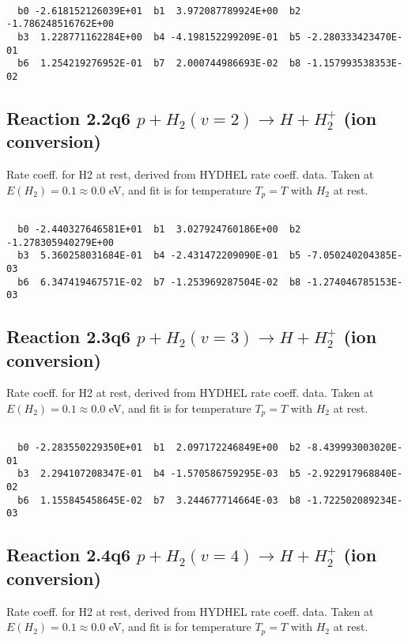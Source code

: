\documentclass[12pt,dvipdfmx]{article}
\begin{document}
\begin{small}\begin{verbatim}

  b0 -2.618152126039E+01  b1  3.972087789924E+00  b2 -1.786248516762E+00
  b3  1.228771162284E+00  b4 -4.198152299209E-01  b5 -2.280333423470E-01
  b6  1.254219276952E-01  b7  2.000744986693E-02  b8 -1.157993538353E-02

\end{verbatim}\end{small}

\newpage
\subsection{
Reaction 2.2q6
$ p + H_2(v=2) \rightarrow H + H_2^+$ (ion conversion)
}
Rate coeff. for H2 at rest, derived from HYDHEL rate coeff. data.
Taken at $E(H_2) = 0.1 \approx 0.0$ eV,  and fit is for temperature $T_p=T$ with $H_2$ at rest.

\begin{small}\begin{verbatim}

  b0 -2.440327646581E+01  b1  3.027924760186E+00  b2 -1.278305940279E+00
  b3  5.360258031684E-01  b4 -2.431472209090E-01  b5 -7.050240204385E-03
  b6  6.347419467571E-02  b7 -1.253969287504E-02  b8 -1.274046785153E-03

\end{verbatim}\end{small}

\newpage
\subsection{
Reaction 2.3q6
$ p + H_2(v=3) \rightarrow H + H_2^+$ (ion conversion)
}
Rate coeff. for H2 at rest, derived from HYDHEL rate coeff. data.
Taken at $E(H_2) = 0.1 \approx 0.0$ eV,  and fit is for temperature $T_p=T$ with $H_2$ at rest.

\begin{small}\begin{verbatim}

  b0 -2.283550229350E+01  b1  2.097172246849E+00  b2 -8.439993003020E-01
  b3  2.294107208347E-01  b4 -1.570586759295E-03  b5 -2.922917968840E-02
  b6  1.155845458645E-02  b7  3.244677714664E-03  b8 -1.722502089234E-03

\end{verbatim}\end{small}

\newpage
\subsection{
Reaction 2.4q6
$ p + H_2(v=4) \rightarrow H + H_2^+$ (ion conversion)
}
Rate coeff. for H2 at rest, derived from HYDHEL rate coeff. data.
Taken at $E(H_2) = 0.1 \approx 0.0$ eV,  and fit is for temperature $T_p=T$ with $H_2$ at rest.
\end{document}
